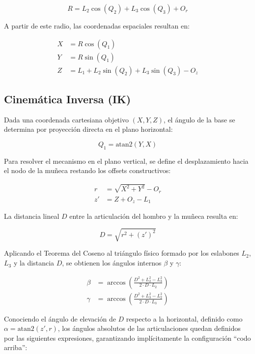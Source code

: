 \documentclass[12pt, a4paper]{report}
\begin{document}
\begin{equation}
    R = L_2 \cos(Q_2) + L_3 \cos(Q_3) + O_r
\end{equation}

A partir de este radio, las coordenadas espaciales resultan en:

\begin{align}
    X &= R \cos(Q_1) \\
    Y &= R \sin(Q_1) \\
    Z &= L_1 + L_2 \sin(Q_2) + L_3 \sin(Q_3) - O_z
\end{align}

\subsection{Cinemática Inversa (IK)}
Dada una coordenada cartesiana objetivo $(X, Y, Z)$, el ángulo de la base se determina por proyección directa en el plano horizontal:

\begin{equation}
    Q_1 = \text{atan2}(Y, X)
\end{equation}

Para resolver el mecanismo en el plano vertical, se define el desplazamiento hacia el nodo de la muñeca restando los offsets constructivos:

\begin{align}
    r &= \sqrt{X^2 + Y^2} - O_r \\
    z' &= Z + O_z - L_1
\end{align}

La distancia lineal $D$ entre la articulación del hombro y la muñeca resulta en:

\begin{equation}
    D = \sqrt{r^2 + (z')^2}
\end{equation}

Aplicando el Teorema del Coseno al triángulo físico formado por los eslabones $L_2$, $L_3$ y la distancia $D$, se obtienen los ángulos internos $\beta$ y $\gamma$:

\begin{align}
    \beta &= \arccos\left(\frac{D^2 + L_2^2 - L_3^2}{2 \cdot D \cdot L_2}\right) \\
    \gamma &= \arccos\left(\frac{D^2 + L_3^2 - L_2^2}{2 \cdot D \cdot L_3}\right)
\end{align}

Conociendo el ángulo de elevación de $D$ respecto a la horizontal, definido como $\alpha = \text{atan2}(z', r)$, los ángulos absolutos de las articulaciones quedan definidos por las siguientes expresiones, garantizando implícitamente la configuración ``codo arriba'':
\end{document}
